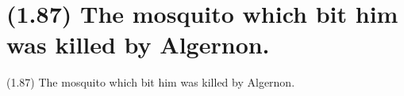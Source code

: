 \documentclass{article}
\begin{document}
\clearpage

%
%

\section*{(1.87) The mosquito which bit him was killed by Algernon.}

\bigbreak
\begin{enumerate*}
\item[(1.87)] The mosquito which bit him was killed by Algernon.
\end{enumerate*}
\bigbreak
\end{document}
